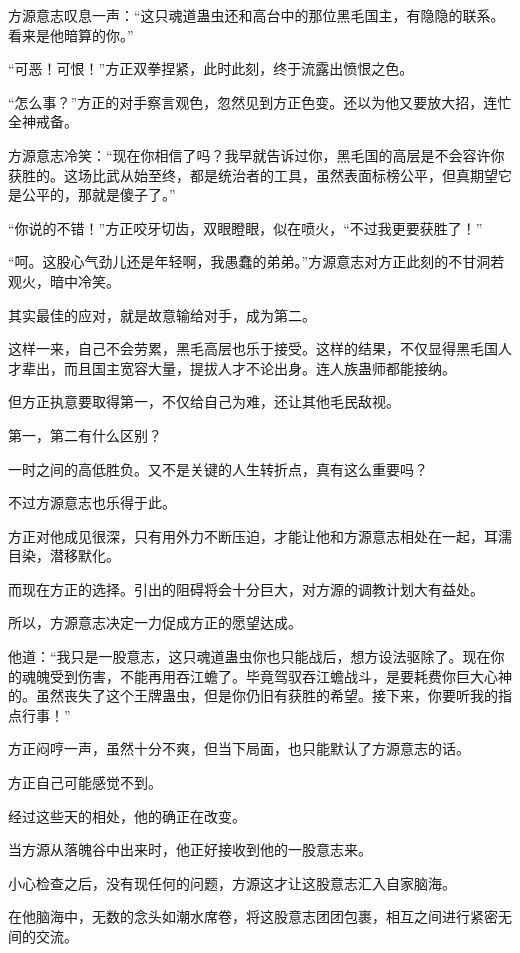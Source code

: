 \begin{this_body}
方源意志叹息一声：“这只魂道蛊虫还和高台中的那位黑毛国主，有隐隐的联系。看来是他暗算的你。”

“可恶！可恨！”方正双拳捏紧，此时此刻，终于流露出愤恨之色。

“怎么事？”方正的对手察言观色，忽然见到方正色变。还以为他又要放大招，连忙全神戒备。

方源意志冷笑：“现在你相信了吗？我早就告诉过你，黑毛国的高层是不会容许你获胜的。这场比武从始至终，都是统治者的工具，虽然表面标榜公平，但真期望它是公平的，那就是傻子了。”

“你说的不错！”方正咬牙切齿，双眼瞪眼，似在喷火，“不过我更要获胜了！”

“呵。这股心气劲儿还是年轻啊，我愚蠢的弟弟。”方源意志对方正此刻的不甘洞若观火，暗中冷笑。

其实最佳的应对，就是故意输给对手，成为第二。

这样一来，自己不会劳累，黑毛高层也乐于接受。这样的结果，不仅显得黑毛国人才辈出，而且国主宽容大量，提拔人才不论出身。连人族蛊师都能接纳。

但方正执意要取得第一，不仅给自己为难，还让其他毛民敌视。

第一，第二有什么区别？

一时之间的高低胜负。又不是关键的人生转折点，真有这么重要吗？

不过方源意志也乐得于此。

方正对他成见很深，只有用外力不断压迫，才能让他和方源意志相处在一起，耳濡目染，潜移默化。

而现在方正的选择。引出的阻碍将会十分巨大，对方源的调教计划大有益处。

所以，方源意志决定一力促成方正的愿望达成。

他道：“我只是一股意志，这只魂道蛊虫你也只能战后，想方设法驱除了。现在你的魂魄受到伤害，不能再用吞江蟾了。毕竟驾驭吞江蟾战斗，是要耗费你巨大心神的。虽然丧失了这个王牌蛊虫，但是你仍旧有获胜的希望。接下来，你要听我的指点行事！”

方正闷哼一声，虽然十分不爽，但当下局面，也只能默认了方源意志的话。

方正自己可能感觉不到。

经过这些天的相处，他的确正在改变。

当方源从落魄谷中出来时，他正好接收到他的一股意志来。

小心检查之后，没有现任何的问题，方源这才让这股意志汇入自家脑海。

在他脑海中，无数的念头如潮水席卷，将这股意志团团包裹，相互之间进行紧密无间的交流。


\end{this_body}

